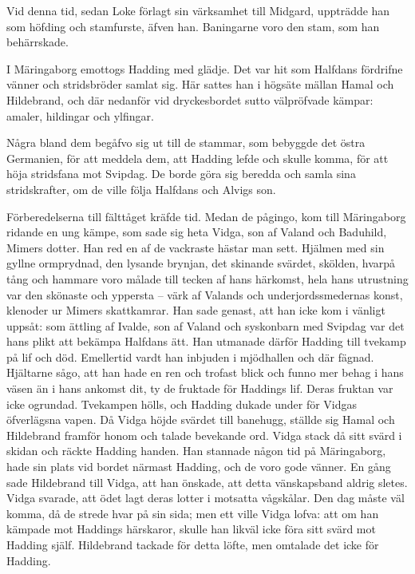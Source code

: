 Vid denna tid, sedan Loke förlagt sin värksamhet till Midgard, uppträdde
han som höfding och stamfurste, äfven han. Baningarne voro den stam, som
han behärrskade.

I Märingaborg emottogs Hadding med glädje. Det var hit som Halfdans
fördrifne vänner och stridsbröder samlat sig. Här sattes han i högsäte
mällan Hamal och Hildebrand, och där nedanför vid dryckesbordet sutto
välpröfvade kämpar: amaler, hildingar och ylfingar.

Några bland dem begåfvo sig ut till de stammar, som bebyggde det östra
Germanien, för att meddela dem, att Hadding lefde och skulle komma, för
att höja stridsfana mot Svipdag. De borde göra sig beredda och samla
sina stridskrafter, om de ville följa Halfdans och Alvigs son.

Förberedelserna till fälttåget kräfde tid. Medan de pågingo, kom till
Märingaborg ridande en ung kämpe, som sade sig heta Vidga, son af Valand
och Baduhild, Mimers dotter. Han red en af de vackraste hästar man sett.
Hjälmen med sin gyllne ormprydnad, den lysande brynjan, det skinande
svärdet, skölden, hvarpå tång och hammare voro målade till tecken af
hans härkomst, hela hans utrustning var den skönaste och yppersta --
värk af Valands och underjordssmedernas konst, klenoder ur Mimers
skattkamrar. Han sade genast, att han icke kom i vänligt uppsåt: som
ättling af Ivalde, son af Valand och syskonbarn med Svipdag var det hans
plikt att bekämpa Halfdans ätt. Han utmanade därför Hadding till tvekamp
på lif och död. Emellertid vardt han inbjuden i mjödhallen och där
fägnad. Hjältarne sågo, att han hade en ren och trofast blick och funno
mer behag i hans väsen än i hans ankomst dit, ty de fruktade för
Haddings lif. Deras fruktan var icke ogrundad. Tvekampen hölls,
\protect\hypertarget{lb1625905.xhtmlux5cux23start157}{}{}\protect\hypertarget{lb1625905.xhtmlux5cux23start157-a}{}{}\protect\hypertarget{lb1625905.xhtmlux5cux23start157-b}{}{}\protect\hypertarget{lb1625905.xhtmlux5cux23start157-c}{}{}\protect\hypertarget{lb1625905.xhtmlux5cux23start157-d}{}{}
och Hadding dukade under för Vidgas öfverlägsna vapen. Då Vidga höjde
svärdet till banehugg, ställde sig Hamal och Hildebrand framför honom
och talade bevekande ord. Vidga stack då sitt svärd i skidan och räckte
Hadding handen. Han stannade någon tid på Märingaborg, hade sin plats
vid bordet närmast Hadding, och de voro gode vänner. En gång sade
Hildebrand till Vidga, att han önskade, att detta vänskapsband aldrig
sletes. Vidga svarade, att ödet lagt deras lotter i motsatta vågskålar.
Den dag måste väl komma, då de strede hvar på sin sida; men ett ville
Vidga lofva: att om han kämpade mot Haddings härskaror, skulle han
likväl icke föra sitt svärd mot Hadding själf. Hildebrand tackade för
detta löfte, men omtalade det icke för Hadding.

